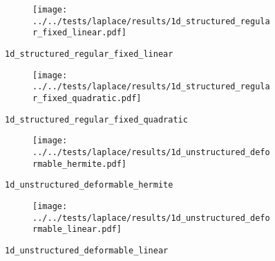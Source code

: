 %
%
\begin{frame}{}
  \vspace*{-0.2cm}
  \begin{figure}[h!]
    \begin{subfigure}[t]{0.48\textwidth}%
      \centering%
      \texttt{[image: ../../tests/laplace/results/1d\_structured\_regular\_fixed\_linear.pdf]}%
    \end{subfigure}%
    \caption{\lstinline{1d_structured_regular_fixed_linear}}
  \end{figure} 
\end{frame}
%
%
\begin{frame}{}
  \vspace*{-0.2cm}
  \begin{figure}[h!]
    \begin{subfigure}[t]{0.48\textwidth}%
      \centering%
      \texttt{[image: ../../tests/laplace/results/1d\_structured\_regular\_fixed\_quadratic.pdf]}%
    \end{subfigure}%
    \caption{\lstinline{1d_structured_regular_fixed_quadratic}}
  \end{figure} 
\end{frame}
%
%
\begin{frame}{}
  \vspace*{-0.2cm}
  \begin{figure}[h!]
    \begin{subfigure}[t]{0.48\textwidth}%
      \centering%
      \texttt{[image: ../../tests/laplace/results/1d\_unstructured\_deformable\_hermite.pdf]}%
    \end{subfigure}%
    \caption{\lstinline{1d_unstructured_deformable_hermite}}
  \end{figure} 
\end{frame}
%
%
\begin{frame}{}
  \vspace*{-0.2cm}
  \begin{figure}[h!]
    \begin{subfigure}[t]{0.48\textwidth}%
      \centering%
      \texttt{[image: ../../tests/laplace/results/1d\_unstructured\_deformable\_linear.pdf]}%
    \end{subfigure}%
    \caption{\lstinline{1d_unstructured_deformable_linear}}
  \end{figure} 
\end{frame}
